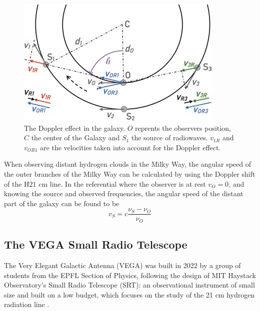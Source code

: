 \begin{figure}[htbp]
    \centering
    \includegraphics[width=0.7\linewidth]{figures/doppler_galaxy.png}
    \caption{The Doppler effect in the galaxy. $O$ reprents the observers position, $C$ the center of the Galaxy and $S_1$ the source of radiowaves. $v_{1R}$ and $v_{OR1}$ are the velocities taken into account for the Doppler effect. \cite{lauterbach_radio_2022}}
    \label{fig:doppler_galaxy}
\end{figure}

When observing distant hydrogen clouds in the Milky Way, the angular speed of the outer branches of the Milky Way can be calculated by using the Doppler shift of the H$21$ cm line. In the referential where the observer is at rest $v_O = 0$, and knowing the source and observed frequencies, the angular speed of the distant part of the galaxy can be found to be
\begin{equation}
    v_S = c \frac{\nu_S - \nu_O}{\nu_O}
    \label{eq:doppler}
\end{equation}

\subsection{The VEGA Small Radio Telescope}
The Very Elegant Galactic Antenna (VEGA) was built in 2022 by a group of students from the EPFL Section of Physics, following the design of MIT Haystack Observatory's Small Radio Telescope (SRT): an observational instrument of small size and built on a low budget, which focuses on the study of the 21 cm hydrogen radiation line \cite{interdisciplinary_project_2022}.

